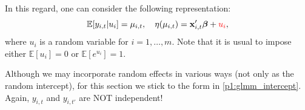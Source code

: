 \documentclass[ignorenonframetext,]{beamer}
\begin{document}
\begin{frame}[allowframebreaks]
\framebreak

In this regard, one can consider the following representation:
\begin{equation} \label{p1:glmm_intercept}
\mathbb{E}[y_{i,t}|u_i] = \mu_{i,t}, \quad \eta(\mu_{i,t}) = \mathbf{x}_{i,t}'\bm{\beta} + {\color{red}u_i},
\end{equation}
where $u_i$ is a random variable for $i=1,\ldots, m$. Note that it is usual to impose either $\mathbb{E}[u_i]=0$ or $\mathbb{E}[e^{u_i}]=1$.

Although we may incorporate random effects in various ways (not only as the random intercept), for this section we stick to the form in \eqref{p1:glmm_intercept}. Again, $y_{i,t}$ and $y_{i,t'}$ are NOT independent!

\end{frame}
\end{document}
